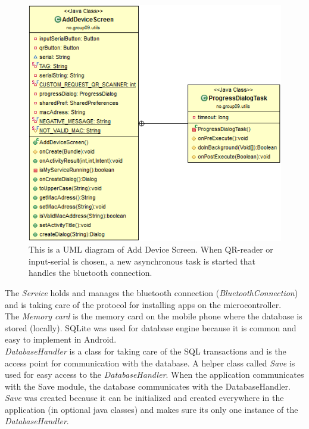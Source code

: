	\begin{figure}[H]
	\centering
	\includegraphics[scale=0.85]{images/UML/adddevicescreen.png}
	\caption[UML - AddDeviceScreen]{This is a UML diagram of Add Device Screen. When QR-reader or input-serial is chosen, a new asynchronous task is started that handles the bluetooth connection.}
	\label{fig:adddevicescreenuml}
	\end{figure}

	The \textit{Service} holds and manages the bluetooth connection (\textit{BluetoothConnection}) and is taking care of the protocol for installing apps on the microcontroller. \\

	The \textit{Memory card} is the memory card on the mobile phone where the database is stored (locally). SQLite was used for database engine because it is common and easy to implement in Android.\\

	\textit{DatabaseHandler} is a class for taking care of the SQL transactions and is the access point for communication with the database. A helper class called \textit{Save} is used for easy access to the \textit{DatabaseHandler}.
	When the application communicates with the Save module, the database communicates with the DatabaseHandler.
	\textit{Save} was created because it can be initialized and created everywhere in the application (in optional java classes) and makes sure its only one instance of the \textit{DatabaseHandler}.

